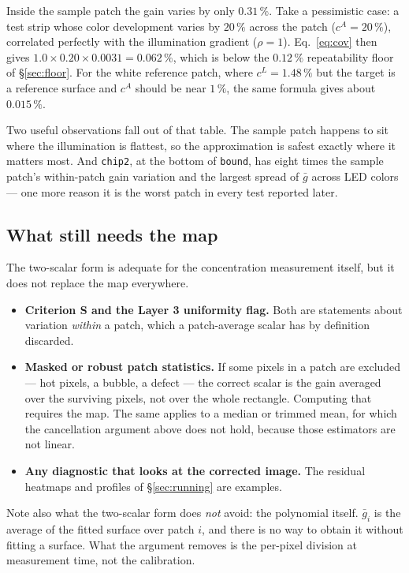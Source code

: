 \documentclass[11pt, a4paper]{article}
\newcommand{\code}[1]{\texttt{#1}}
\newcommand{\pct}{\,\%}
\begin{document}
Inside the sample patch the gain varies by only $0.31\pct$.
Take a pessimistic case:
a test strip whose color development varies by $20\pct$ across the patch
($c^{A} = 20\pct$),
correlated perfectly with the illumination gradient ($\rho = 1$).
Eq.~\ref{eq:cov} then gives $1.0 \times 0.20 \times 0.0031 = 0.062\pct$,
which is below the $0.12\pct$ repeatability floor of \S\ref{sec:floor}.
For the white reference patch,
where $c^{L} = 1.48\pct$ but the target is a reference surface
and $c^{A}$ should be near $1\pct$,
the same formula gives about $0.015\pct$.

Two useful observations fall out of that table.
The sample patch happens to sit where the illumination is flattest,
so the approximation is safest exactly where it matters most.
And \code{chip2}, at the bottom of \code{bound},
has eight times the sample patch's within-patch gain variation
and the largest spread of $\bar{g}$ across LED colors ---
one more reason it is the worst patch in every test reported later.

\subsection{What still needs the map}

The two-scalar form is adequate for the concentration measurement itself,
but it does not replace the map everywhere.

\begin{itemize}[nosep]
  \item \textbf{Criterion S and the Layer 3 uniformity flag.}
        Both are statements about variation \emph{within} a patch,
        which a patch-average scalar has by definition discarded.
  \item \textbf{Masked or robust patch statistics.}
        If some pixels in a patch are excluded ---
        hot pixels, a bubble, a defect ---
        the correct scalar is the gain averaged over the surviving pixels,
        not over the whole rectangle.
        Computing that requires the map.
        The same applies to a median or trimmed mean,
        for which the cancellation argument above does not hold,
        because those estimators are not linear.
  \item \textbf{Any diagnostic that looks at the corrected image.}
        The residual heatmaps and profiles of \S\ref{sec:running} are examples.
\end{itemize}

Note also what the two-scalar form does \emph{not} avoid:
the polynomial itself.
$\bar{g}_i$ is the average of the fitted surface over patch $i$,
and there is no way to obtain it without fitting a surface.
What the argument removes is the per-pixel division at measurement time,
not the calibration.
\end{document}

